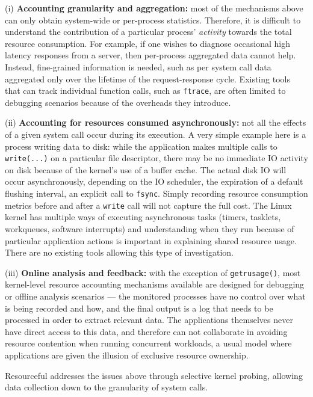 \documentclass[letterpaper,twocolumn,10pt]{article}
\newcommand{\pname}{Resourceful}
\begin{document}
(i) \textbf{Accounting granularity and aggregation:} most of the mechanisms
above can only obtain system-wide or per-process statistics. Therefore, it is
difficult to understand the contribution of a particular process'
\textit{activity} towards the total resource consumption. For example, if one
wishes to diagnose occasional high latency responses from a server, then
per-process aggregated data cannot help. Instead, fine-grained information is
needed, such as per system call data aggregated only over the lifetime of the
request-response cycle. Existing tools that can track individual function calls,
such as \texttt{ftrace}, are often limited to debugging scenarios because of the overheads
they introduce.

(ii) \textbf{Accounting for resources consumed asynchronously:} not all the
effects of a given system call occur during its execution. A very simple example here
is a process writing data to disk: while the application makes multiple calls to
\texttt{write(...)} on a particular file descriptor, there may be no immediate
IO activity on disk because of the kernel's use of a buffer cache. The actual disk IO
will occur asynchronously, depending on the IO scheduler, the expiration of a
default flushing interval, an explicit call to \texttt{fsync}. Simply
recording resource consumption metrics before and after a \texttt{write}
call will not capture the full cost. The Linux kernel has multiple ways of
executing asynchronous tasks (timers, tasklets, workqueues, software
interrupts) and understanding when they run because of particular application
actions is important in explaining shared resource usage. There are no existing
tools allowing this type of investigation.

(iii) \textbf{Online analysis and feedback:} with the exception of
\texttt{getrusage()}, most kernel-level resource accounting mechanisms available
are designed for debugging or offline analysis scenarios --- the monitored
processes have no control over what is being recorded and how, and the final
output is a log that needs to be processed in order to extract relevant data.
The applications themselves never have direct access to this data, and therefore
can not collaborate in avoiding resource contention when running concurrent
workloads, a usual model where applications are given the illusion of exclusive
resource ownership.

\pname{ }addresses the issues above through selective kernel probing, allowing
data collection down to the granularity of system calls.
\end{document}
